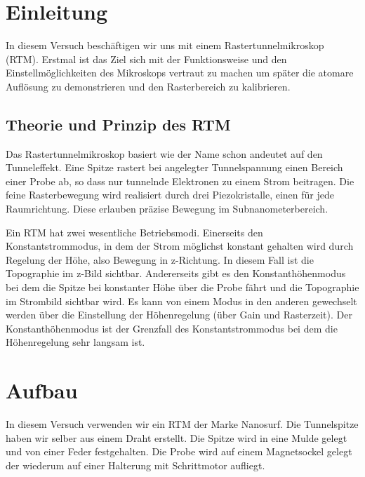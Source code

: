 \tableofcontents
\newpage
\listoffigures

\listoftables

\skippage

\setcounter{page}{1}
\restoregeometry
\thispagestyle{fancy}


\section{Einleitung}

In diesem Versuch beschäftigen wir uns mit einem Rastertunnelmikroskop (RTM). Erstmal ist das Ziel sich mit der Funktionsweise und den Einstellmöglichkeiten des Mikroskops vertraut zu machen um später die atomare Auflösung zu demonstrieren und den Rasterbereich zu kalibrieren.

\subsection{Theorie und Prinzip des RTM}

Das Rastertunnelmikroskop basiert wie der Name schon andeutet auf den Tunneleffekt. Eine Spitze rastert bei angelegter Tunnelspannung einen Bereich einer Probe ab, so dass nur tunnelnde Elektronen zu einem Strom beitragen. Die feine Rasterbewegung wird realisiert durch drei Piezokristalle, einen für jede Raumrichtung. Diese erlauben präzise Bewegung im Subnanometerbereich.

Ein RTM hat zwei wesentliche Betriebsmodi. Einerseits den Konstantstrommodus, in dem der Strom möglichst konstant gehalten wird durch Regelung der Höhe, also Bewegung in z-Richtung. In diesem Fall ist die Topographie im z-Bild sichtbar. Andererseits gibt es den Konstanthöhenmodus bei dem die Spitze bei konstanter Höhe über die Probe fährt und die Topographie im Strombild sichtbar wird. Es kann von einem Modus in den anderen gewechselt werden über die Einstellung der Höhenregelung (über Gain und Rasterzeit). Der Konstanthöhenmodus ist der Grenzfall des Konstantstrommodus bei dem die Höhenregelung sehr langsam ist.

\section{Aufbau}

In diesem Versuch verwenden wir ein RTM der Marke Nanosurf. Die Tunnelspitze haben wir selber aus einem Draht erstellt. Die Spitze wird in eine Mulde gelegt und von einer Feder festgehalten. Die Probe wird auf einem Magnetsockel gelegt der wiederum auf einer Halterung mit Schrittmotor aufliegt.

